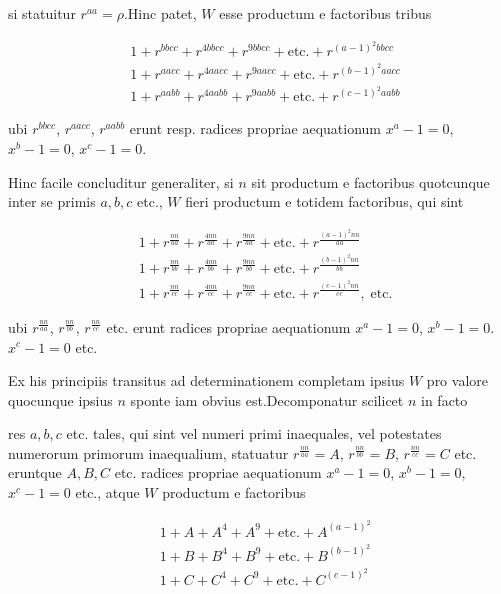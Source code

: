 si statuitur $r^{aa}=\rho$.\quad Hinc patet, $W$ esse productum e factoribus tribus

\[
\begin{aligned}
&1+r^{bbcc}+r^{4bbcc}+r^{9bbcc}+\text{etc.}+r^{(a-1)^2bbcc}\\
&1+r^{aacc}+r^{4aacc}+r^{9aacc}+\text{etc.}+r^{(b-1)^2aacc}\\
&1+r^{aabb}+r^{4aabb}+r^{9aabb}+\text{etc.}+r^{(c-1)^2aabb}
\end{aligned}
\]

ubi $r^{bbcc}$, $r^{aacc}$, $r^{aabb}$ erunt resp. radices propriae aequationum $x^a-1=0$, $x^b-1=0$, $x^c-1=0$.


Hinc facile concluditur generaliter, si $n$ sit productum e factoribus quotcunque inter se primis $a,b,c$ etc., $W$ fieri productum e totidem factoribus, qui sint

\[
\begin{aligned}
&1+r^{\frac{nn}{aa}}+r^{\frac{4nn}{aa}}+r^{\frac{9nn}{aa}}+\text{etc.}+r^{\frac{(a-1)^2nn}{aa}}\\
&1+r^{\frac{nn}{bb}}+r^{\frac{4nn}{bb}}+r^{\frac{9nn}{bb}}+\text{etc.}+r^{\frac{(b-1)^2nn}{bb}}\\
&1+r^{\frac{nn}{cc}}+r^{\frac{4nn}{cc}}+r^{\frac{9nn}{cc}}+\text{etc.}+r^{\frac{(c-1)^2nn}{cc}},\;\text{etc.}
\end{aligned}
\]

ubi $r^{\frac{nn}{aa}}$, $r^{\frac{nn}{bb}}$, $r^{\frac{nn}{cc}}$ etc. erunt radices propriae aequationum $x^a-1=0$, $x^b-1=0$. $x^c-1=0$ etc.


Ex his principiis transitus ad determinationem completam ipsius $W$ pro valore quocunque ipsius $n$ sponte iam obvius est.\quad Decomponatur scilicet $n$ in facto

res $a,b,c$ etc. tales, qui sint vel numeri primi inaequales, vel potestates numerorum primorum inaequalium, statuatur $r^{\frac{nn}{aa}}=A$, $r^{\frac{nn}{bb}}=B$, $r^{\frac{nn}{cc}}=C$ etc. eruntque $A,B,C$ etc. radices propriae aequationum $x^a-1=0$, $x^b-1=0$, $x^c-1=0$ etc., atque $W$ productum e factoribus

\[
\begin{aligned}
&1+A+A^4+A^9+\text{etc.}+A^{(a-1)^2}\\
&1+B+B^4+B^9+\text{etc.}+B^{(b-1)^2}\\
&1+C+C^4+C^9+\text{etc.}+C^{(c-1)^2}
\end{aligned}
\]

